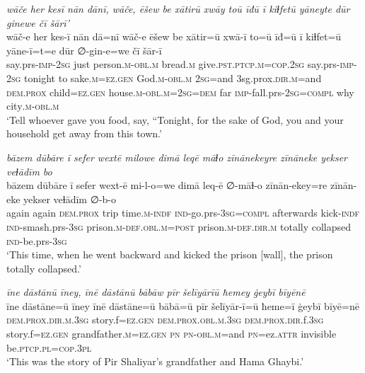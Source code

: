 \ea \label{BP.165}
\textit{wāče her kesī nān dānī, wāče, ēšew be xātirū xwāy toū īđū ī kiɫfetū yāneyte dūr ginewe čī šārī’} \\ 
\gll wāč-e her kes-ī nān dā=nī wāč-e ēšew be xātir=ū xwā-ī to=ū īđ=ū ī kiɫfet=ū yāne-ī=t=e dūr ∅-gin-e=we čī šār-ī \\ 
 say.prs-\textsc{imp-}\textsc{2sg} just person\textsc{.m}\textsc{-obl}\textsc{.m} bread\textsc{.m} give\textsc{.pst}\textsc{.ptcp}\textsc{.m}\textsc{=cop}\textsc{.\textsc{2sg}} say.prs-\textsc{imp-}\textsc{2sg} tonight to sake\textsc{.m}\textsc{=ez.gen} God\textsc{.m}\textsc{-obl}\textsc{.m} \textsc{2sg}=and 3sg.prox\textsc{.dir}\textsc{.m}=and \textsc{dem.prox} child\textsc{=ez.gen} house\textsc{.m}\textsc{-obl}\textsc{.m}\textsc{=\textsc{2sg}}\textsc{=dem} far \textsc{imp-}fall.prs-\textsc{2sg}\textsc{=compl} why city\textsc{.m}\textsc{-obl}\textsc{.m} \\ 
\glt `Tell whoever gave you food, say, “Tonight, for the sake of God, you and your household get away from this town.'
\z 
 
\ea \label{BP.173}
\textit{bāzem dūbāre ī sefer wextē milowe dimā leqē māɫo zīnānekeyre zīnāneke yekser veɫādīm bo} \\ 
\gll bāzem dūbāre ī sefer wext-ē mi-l-o=we dimā leq-ē ∅-māɫ-o zīnān-ekey=re zīnān-eke yekser veɫādīm ∅-b-o \\ 
 again again \textsc{dem.prox} trip time\textsc{.m}\textsc{-indf} \textsc{ind-}go.prs\textsc{-3sg}\textsc{=compl} afterwards kick\textsc{-indf} \textsc{ind-}smash.prs\textsc{-3sg} prison\textsc{.m}\textsc{-def}\textsc{.obl}\textsc{.m}\textsc{=\textsc{post}} prison\textsc{.m}\textsc{-def}\textsc{.dir}\textsc{.m} totally collapsed \textsc{ind-}be.prs\textsc{-3sg} \\ 
\glt `This time, when he went backward and kicked the prison [wall], the prison totally collapsed.'
\z 
 
\ea \label{BP.208}
\textit{īne dāstānū īney, īnē dāstānū bābāw pīr šelīyārīū ħemey ġeybī bīyēnē} \\ 
\gll īne dāstāne=ū īney īnē dāstāne=ū bābā=ū pīr šelīyār-ī=ū ħeme=ī ġeybī bīyē=nē \\ 
 \textsc{dem.prox}\textsc{.dir}\textsc{.m}\textsc{.3sg} story.f\textsc{=ez.gen} \textsc{dem.prox}\textsc{.obl}\textsc{.m}\textsc{.3sg} \textsc{dem.prox}\textsc{.dir}.f\textsc{.3sg} story.f\textsc{=ez.gen} grandfather\textsc{.m}\textsc{=ez.gen} \textsc{pn} \textsc{pn}\textsc{-obl}\textsc{.m}=and \textsc{pn}=ez.\textsc{attr} invisible be\textsc{.ptcp}\textsc{.pl}\textsc{=cop}\textsc{.3pl} \\ 
\glt `This was the story of Pir Shaliyar’s grandfather and Hama Ghaybi.'
\z 
 
